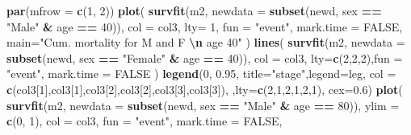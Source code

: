 \documentclass[
]{book}
\newenvironment{Shaded}{\begin{snugshade}}{\end{snugshade}}
\newcommand{\AttributeTok}[1]{\textcolor[rgb]{0.13,0.29,0.53}{#1}}
\newcommand{\ConstantTok}[1]{\textcolor[rgb]{0.56,0.35,0.01}{#1}}
\newcommand{\DecValTok}[1]{\textcolor[rgb]{0.00,0.00,0.81}{#1}}
\newcommand{\FloatTok}[1]{\textcolor[rgb]{0.00,0.00,0.81}{#1}}
\newcommand{\FunctionTok}[1]{\textcolor[rgb]{0.13,0.29,0.53}{\textbf{#1}}}
\newcommand{\NormalTok}[1]{#1}
\newcommand{\SpecialCharTok}[1]{\textcolor[rgb]{0.81,0.36,0.00}{\textbf{#1}}}
\newcommand{\StringTok}[1]{\textcolor[rgb]{0.31,0.60,0.02}{#1}}
\theoremstyle{definition}
\theoremstyle{definition}
\theoremstyle{definition}
\theoremstyle{definition}
\theoremstyle{remark}
\begin{document}
\begin{Shaded}
\begin{Highlighting}[]
\FunctionTok{par}\NormalTok{(}\AttributeTok{mfrow =} \FunctionTok{c}\NormalTok{(}\DecValTok{1}\NormalTok{, }\DecValTok{2}\NormalTok{))}
\FunctionTok{plot}\NormalTok{(}
  \FunctionTok{survfit}\NormalTok{(m2, }\AttributeTok{newdata =} \FunctionTok{subset}\NormalTok{(newd, sex }\SpecialCharTok{==} \StringTok{"Male"} \SpecialCharTok{\&}\NormalTok{ age }\SpecialCharTok{==} \DecValTok{40}\NormalTok{)),}
  \AttributeTok{col =}\NormalTok{ col3, }
  \AttributeTok{lty=} \DecValTok{1}\NormalTok{,}
  \AttributeTok{fun =} \StringTok{"event"}\NormalTok{, }\AttributeTok{mark.time =} \ConstantTok{FALSE}\NormalTok{,}
  \AttributeTok{main=}\StringTok{"Cum. mortality for M and F }\SpecialCharTok{\textbackslash{}n}\StringTok{ age 40"}
\NormalTok{  )}
\FunctionTok{lines}\NormalTok{(}
  \FunctionTok{survfit}\NormalTok{(m2, }\AttributeTok{newdata =} \FunctionTok{subset}\NormalTok{(newd, sex }\SpecialCharTok{==} \StringTok{"Female"} \SpecialCharTok{\&}\NormalTok{ age }\SpecialCharTok{==} \DecValTok{40}\NormalTok{)),}
  \AttributeTok{col =}\NormalTok{ col3, }\AttributeTok{lty=}\FunctionTok{c}\NormalTok{(}\DecValTok{2}\NormalTok{,}\DecValTok{2}\NormalTok{,}\DecValTok{2}\NormalTok{),}\AttributeTok{fun =} \StringTok{"event"}\NormalTok{, }\AttributeTok{mark.time =} \ConstantTok{FALSE}
\NormalTok{)}
\FunctionTok{legend}\NormalTok{(}\DecValTok{0}\NormalTok{, }\FloatTok{0.95}\NormalTok{, }\AttributeTok{title=}\StringTok{"stage"}\NormalTok{,}\AttributeTok{legend=}\NormalTok{leg,}
       \AttributeTok{col =} \FunctionTok{c}\NormalTok{(col3[}\DecValTok{1}\NormalTok{],col3[}\DecValTok{1}\NormalTok{],col3[}\DecValTok{2}\NormalTok{],col3[}\DecValTok{2}\NormalTok{],col3[}\DecValTok{3}\NormalTok{],col3[}\DecValTok{3}\NormalTok{]),}
\NormalTok{        ,}\AttributeTok{lty=}\FunctionTok{c}\NormalTok{(}\DecValTok{2}\NormalTok{,}\DecValTok{1}\NormalTok{,}\DecValTok{2}\NormalTok{,}\DecValTok{1}\NormalTok{,}\DecValTok{2}\NormalTok{,}\DecValTok{1}\NormalTok{), }\AttributeTok{cex=}\FloatTok{0.6}\NormalTok{)}
\FunctionTok{plot}\NormalTok{(}
  \FunctionTok{survfit}\NormalTok{(m2, }\AttributeTok{newdata =} \FunctionTok{subset}\NormalTok{(newd, sex }\SpecialCharTok{==} \StringTok{"Male"} \SpecialCharTok{\&}\NormalTok{ age }\SpecialCharTok{==} \DecValTok{80}\NormalTok{)),}
  \AttributeTok{ylim =} \FunctionTok{c}\NormalTok{(}\DecValTok{0}\NormalTok{, }\DecValTok{1}\NormalTok{), }\AttributeTok{col =}\NormalTok{ col3, }\AttributeTok{fun =} \StringTok{"event"}\NormalTok{, }\AttributeTok{mark.time =} \ConstantTok{FALSE}\NormalTok{,}

\end{Highlighting}
\end{Shaded}
\end{document}
